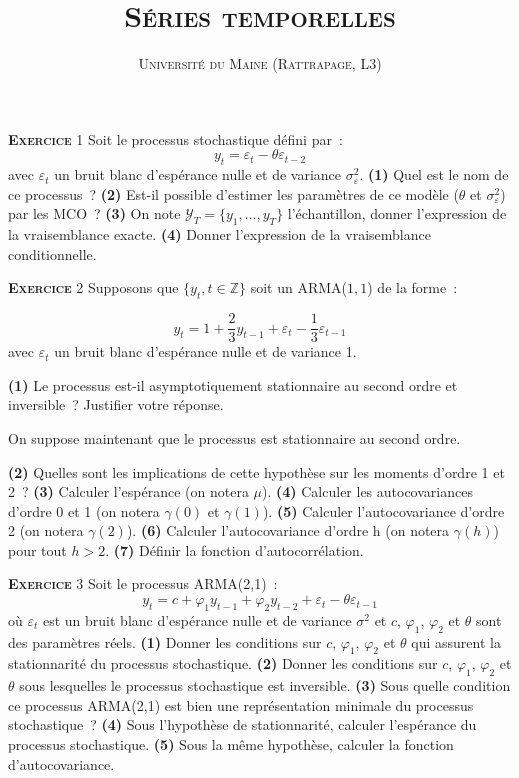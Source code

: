 \documentclass[10pt,a4paper,notitlepage,twocolumn]{article}
\newcommand{\exercice}[1]{\textsc{\textbf{Exercice}} #1}
\newcommand{\question}[1]{\textbf{(#1)}}
\begin{document}
\title{\textsc{Séries temporelles}}
\author{\textsc{Université du Maine (Rattrapage, L3)}}
\date{}

\maketitle

\exercice{1} Soit le processus stochastique défini par :
\[
  y_t = \varepsilon_t - \theta \varepsilon_{t-2}
\]
avec $\varepsilon_t$ un bruit blanc d'espérance nulle et de variance
$\sigma_{\varepsilon}^2$. \textbf{(1)} Quel est le nom de ce
processus ? \textbf{(2)} Est-il possible d'estimer les paramètres de
ce modèle ($\theta$ et $\sigma_{\varepsilon}^2$) par les MCO ?
\textbf{(3)} On note $\mathcal Y_T = \{y_1,\dots,y_T\}$ l'échantillon,
donner l'expression de la vraisemblance exacte. \textbf{(4)} Donner
l'expression de la vraisemblance conditionnelle.

\bigskip
\bigskip

\exercice{2} Supposons que $\{y_t,t\in\mathbb Z\}$ soit un ARMA($1,1$) de la forme :

\[
y_t = 1 + \frac{2}{3}y_{t-1} + \varepsilon_t - \frac{1}{3} \varepsilon_{t-1}
\]
avec $\varepsilon_t$ un bruit blanc d'espérance nulle et de variance 1.\newline

\question{1}   Le    processus   est-il   asymptotiquement
stationnaire  au   second  ordre   et  inversible~?   Justifier  votre
réponse.\newline

On suppose maintenant que le processus est stationnaire au second
ordre.\newline

\question{2} Quelles sont les implications de cette hypothèse sur les
moments d'ordre 1 et 2 ? \question{3} Calculer l'espérance (on notera
$\mu$). \question{4} Calculer les autocovariances d'ordre
0 et 1 (on notera $\gamma(0)$ et $\gamma(1)$). \question{5} Calculer
l'autocovariance d'ordre 2 (on notera $\gamma(2)$). \question{6}
Calculer l'autocovariance d'ordre h (on notera $\gamma(h)$) pour tout
$h>2$.  \question{7} Définir la fonction d'autocorrélation.

\bigskip
\bigskip

\exercice{3} Soit le processus ARMA(2,1) :
\[
y_t = c + \varphi_1 y_{t-1} + \varphi_2 y_{t-2} + \varepsilon_t - \theta \varepsilon_{t-1}
\]
où $\varepsilon_t$ est un bruit blanc d'espérance nulle et de variance
$\sigma^2$ et $c$, $\varphi_1$, $\varphi_2$ et $\theta$ sont des
paramètres réels. \textbf{(1)} Donner les conditions sur $c$,
$\varphi_1$, $\varphi_2$ et $\theta$ qui assurent la stationnarité du
processus stochastique. \textbf{(2)} Donner les conditions sur $c$,
$\varphi_1$, $\varphi_2$ et $\theta$ sous lesquelles le processus
stochastique est inversible. \textbf{(3)} Sous quelle condition ce
processus ARMA(2,1) est bien une représentation minimale du processus
stochastique ? \textbf{(4)} Sous l'hypothèse de stationnarité,
calculer l'espérance du processus stochastique. \textbf{(5)} Sous la
même hypothèse, calculer la fonction d'autocovariance.
\end{document}
